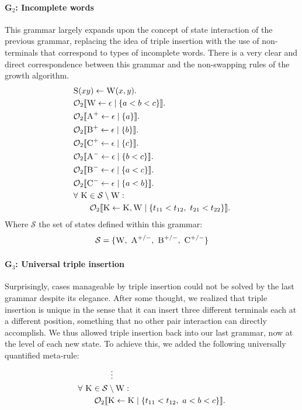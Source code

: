\documentclass[nonatbib,numbers,10pt]{llncs}
\newcommand\s{\textsc}
\newcommand{\Orderr}[5]{
	\mathcal{#1}_{#5}\llbracket #2 \leftarrow #3 \mid \{ #4 \} \rrbracket.
}
\newcommand{\Or}[4]{\Orderr{O}{#1}{#2}{#3}{#4}}
\begin{document}
\paragraph{G$_2$: Incomplete words}
This grammar largely expands upon the concept of state interaction of the previous grammar, replacing the idea of triple insertion with the use of non-terminals that correspond to types of incomplete words. There is a very clear and direct correspondence between this grammar and the non-swapping rules of the growth algorithm.
\begin{align*}
&\s{S}(xy) \leftarrow \s{W}(x,y). \\
&\Or{\s{W}}{\epsilon}{a < b < c}{2} \\
&\Or{\s{A}^+}{\epsilon}{a}{2} \\
&\Or{\s{B}^+}{\epsilon}{b}{2} \\
&\Or{\s{C}^+}{\epsilon}{c}{2} \\
&\Or{\s{A}^-}{\epsilon}{b < c}{2} \\
&\Or{\s{B}^-}{\epsilon}{a < c}{2} \\
&\Or{\s{C}^-}{\epsilon}{a < b}{2} \\
&\forall \ \s{K} \in \mathcal{S} \setminus \s{W}:\\ 
&\quad\quad\Or{\s{K}}{\s{K}, \s{W}}{t_{11} < t_{12},\ t_{21} < t_{22}}{2}
\end{align*}
Where $\mathcal{S}$ the set of states defined within this grammar:
\[
\mathcal{S}= \{\textsc{W},\ \textsc{A}^{+/-},\ \textsc{B}^{+/-},\ \textsc{C}^{+/-}\}
\]
\paragraph{G$_3$: Universal triple insertion}
Surprisingly, cases manageable by triple insertion could not be solved by the last grammar despite its elegance. After some thought, we realized that triple insertion is unique in the sense that it can insert three different terminals each at a different position, something that no other pair interaction can directly accomplish. We thus allowed triple insertion back into our last grammar, now at the level of each new state. To achieve this, we added the following universally quantified meta-rule:
\begin{align*}
& \quad\quad\quad\quad \vdots \\
&\forall \ \s{K} \in \mathcal{S} \setminus \s{W}:\\ 
&\quad\quad\Or{\s{K}}{\s{K}}{t_{11} < t_{12},\ a < b < c}{2}
\end{align*}
\end{document}
